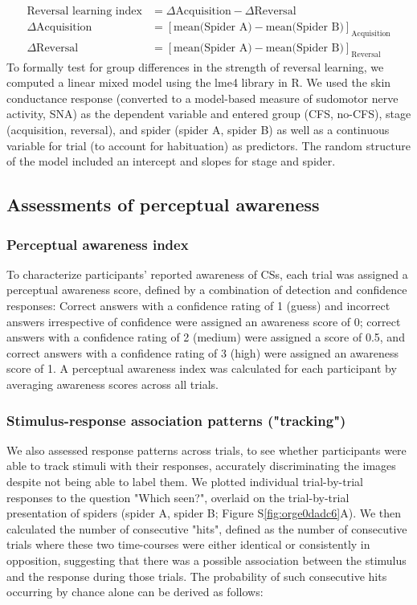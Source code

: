\documentclass[12pt]{article}
\begin{document}
\begin{equation}
\begin{aligned}
  \text{Reversal learning index} &= \Delta \text{Acquisition} - \Delta \text{Reversal} \\
 \Delta \text{Acquisition} &= [\text{mean(Spider A)} - \text{mean(Spider B)}]_{\mathrm{Acquisition}} \\
    \Delta \text{Reversal} &= [\text{mean(Spider A)} - \text{mean(Spider B)}]_{\mathrm{Reversal}} 
\end{aligned}
\end{equation}
To formally test for group differences in the strength of reversal
learning, we computed a linear mixed model using the lme4 library in
R. We used the skin conductance response (converted to a model-based
measure of sudomotor nerve activity, SNA) as the dependent variable and
entered group (CFS, no-CFS), stage (acquisition, reversal), and spider
(spider A, spider B) as well as a continuous variable for trial (to
account for habituation) as predictors. The random structure of the
model included an intercept and slopes for stage and spider.

\subsection*{Assessments of perceptual awareness}
\label{sec:org0fbfc2f}
\subsubsection*{Perceptual awareness index}
\label{sec:org52ca384}
To characterize participants' reported awareness of CSs, each trial was
assigned a perceptual awareness score, defined by a combination of
detection and confidence responses: Correct answers with a confidence
rating of 1 (guess) and incorrect answers irrespective of confidence
were assigned an awareness score of 0; correct answers with a confidence
rating of 2 (medium) were assigned a score of 0.5, and correct answers
with a confidence rating of 3 (high) were assigned an awareness score
of 1. A perceptual awareness index was calculated for each participant
by averaging awareness scores across all trials.

\subsubsection*{Stimulus-response association patterns ("tracking")}
\label{sec:org36d4f2d}
We also assessed response patterns across trials, to see whether
participants were able to track stimuli with their responses, accurately
discriminating the images despite not being able to label them. We
plotted individual trial-by-trial responses to the question "Which
seen?", overlaid on the trial-by-trial presentation of spiders (spider
A, spider B; Figure S\ref{fig:orge0dadc6}A). We then calculated the number of
consecutive "hits", defined as the number of consecutive trials where
these two time-courses were either identical or consistently in
opposition, suggesting that there was a possible association between the
stimulus and the response during those trials. The probability of such
consecutive hits occurring by chance alone can be derived as follows:
\end{document}
